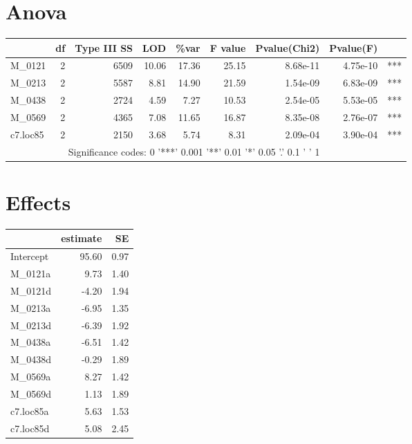 \documentclass[a4paper,11pt]{article}\usepackage[]{graphicx}\usepackage[]{color}
\begin{document}
\section{Anova}
\begin{table}[ht]
\begin{flushleft}
\begin{tabular}{lrrrrrrrl}
  \hline
 & df & Type III SS & LOD & \%var & F value & Pvalue(Chi2) & Pvalue(F) &  \\ 
  \hline
M\_0121 & 2 & 6509 & 10.06 & 17.36 & 25.15 & 8.68e-11 & 4.75e-10 & *** \\ 
  M\_0213 & 2 & 5587 & 8.81 & 14.90 & 21.59 & 1.54e-09 & 6.83e-09 & *** \\ 
  M\_0438 & 2 & 2724 & 4.59 & 7.27 & 10.53 & 2.54e-05 & 5.53e-05 & *** \\ 
  M\_0569 & 2 & 4365 & 7.08 & 11.65 & 16.87 & 8.35e-08 & 2.76e-07 & *** \\ 
  c7.loc85 & 2 & 2150 & 3.68 & 5.74 & 8.31 & 2.09e-04 & 3.90e-04 & *** \\ 
   \hline  \multicolumn{8}{c}{Significance codes:  0 '***' 0.001 '**' 0.01 '*' 0.05 '.' 0.1 ' ' 1} \\ \hline
\end{tabular}
\label{anova}
\end{flushleft}
\end{table}

\clearpage
\section{Effects}
\begin{table}[ht]
\begin{flushleft}
\begin{tabular}{lrr}
  \hline
 & estimate & SE \\ 
  \hline
Intercept & 95.60 & 0.97 \\ 
  M\_0121a & 9.73 & 1.40 \\ 
  M\_0121d & -4.20 & 1.94 \\ 
  M\_0213a & -6.95 & 1.35 \\ 
  M\_0213d & -6.39 & 1.92 \\ 
  M\_0438a & -6.51 & 1.42 \\ 
  M\_0438d & -0.29 & 1.89 \\ 
  M\_0569a & 8.27 & 1.42 \\ 
  M\_0569d & 1.13 & 1.89 \\ 
  c7.loc85a & 5.63 & 1.53 \\ 
  c7.loc85d & 5.08 & 2.45 \\ 
   \hline
\end{tabular}
\label{effects}
\end{flushleft}
\end{table}

\end{document}
